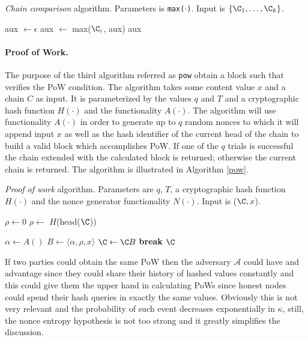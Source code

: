 \documentclass[..]{subfiles}
\begin{document}
\begin{algorithm}
	\caption{\textit{Chain comparison} algorithm. Parameters is \texttt{max($\cdot$)}. Input is $\{\C_1, \dots, \C_k\}$.}\label{maxvalid}
\begin{algorithmic}[1]
	\State aux $\gets \epsilon$
			aux $\gets $ max($\C_i$, aux)
		\EndIf
	\EndFor
	\State
	\Return aux
	\EndFunction
\end{algorithmic}
\end{algorithm}


\paragraph{Proof of Work.} The purpose of the third algorithm referred as \texttt{pow} obtain a block such that verifies the PoW condition. The algorithm takes some content value $x$ and a chain $C$ as input. It is parameterized by the values $q$ and $T$ and a cryptographic hash function $H(\cdot)$ and the functionality $A(\cdot)$. The algorithm will use functionality $A(\cdot)$ in order to generate up to $q$ random nonces to which it will append input $x$ as well as the hash identifier of the current head of the chain to build a valid block which accomplishes PoW. If one of the $q$ trials is successful the chain extended with the calculated block is returned; otherwise the current chain is returned. The algorithm is illustrated in Algorithm \ref{pow}.

\begin{algorithm}
	\caption{\textit{Proof of work} algorithm. Parameters are $q$, $T$, a cryptographic hash function $H(\cdot)$ and the nonce generator functionality $N(\cdot)$. Input is ($\C, x$).}\label{pow}
\begin{algorithmic}[1]
	\If{$\C = \epsilon$}
		\State $\rho \gets 0$
	\Else
		\State $\rho \gets $ $H$(head($\C$))
	\EndIf
	\State

		\State $\alpha \gets A()$
			\State $B \gets \langle \alpha, \rho, x \rangle$
			\State $\C \gets \C B$
			\State \textbf{break}
		\EndIf
	\EndFor
	\State
	\Return $\C$
	\EndFunction
\end{algorithmic}
\end{algorithm}

\begin{remark}\label{rem:nonce-entropy}
	\normalfont
	If two parties could obtain the same PoW then the adversary $\mathcal{A}$ could have and advantage since they could share their history of hashed values constantly and this could give them the upper hand in calculating PoWs since honest nodes could spend their hash queries in exactly the same values. Obviously this is not very relevant and the probability of such event decreases exponentially in $\kappa$, still, the nonce entropy hypothesis is not too strong and it greatly simplifies the discussion.
\end{remark}
\end{document}
